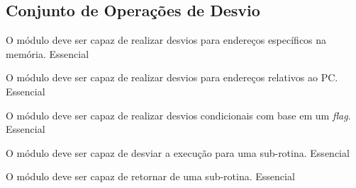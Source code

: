     \subsection{Conjunto de Operações de Desvio}
	    
	  \begin{functional}
		{O módulo deve ser capaz de realizar desvios para endereços específicos na memória.}
		{Essencial} 
		 
		 {O módulo deve ser capaz de realizar desvios para endereços relativos ao PC.}
		 {Essencial}
		 
		 {O módulo deve ser capaz de realizar desvios condicionais com base em um \textit{flag}.}
		 {Essencial}
		 
		 {O módulo deve ser capaz de desviar a execução para uma sub-rotina.}
		 {Essencial}
		 
		 {O módulo deve ser capaz de retornar de uma sub-rotina.}
		 {Essencial}
         
	  \end{functional}